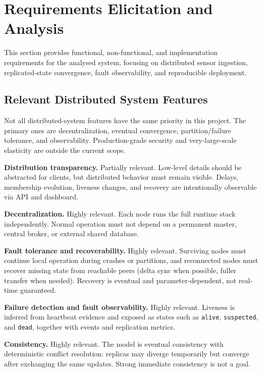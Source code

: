 \section{Requirements Elicitation and Analysis}\label{requirements}

This section provides functional, non-functional, and implementation requirements for the analysed system, focusing on distributed sensor ingestion, replicated-state convergence, fault observability, and reproducible deployment.

\subsection{Relevant Distributed System Features}
\label{ds-features}

Not all distributed-system features have the same priority in this project. The primary ones are decentralization, eventual convergence, partition/failure tolerance, and observability. Production-grade security and very-large-scale elasticity are outside the current scope.

\textbf{Distribution transparency.}
Partially relevant. Low-level details should be abstracted for clients, but distributed behavior must remain visible. Delays, membership evolution, liveness changes, and recovery are intentionally observable via API and dashboard.

\medskip
\textbf{Decentralization.}
Highly relevant. Each node runs the full runtime stack independently. Normal operation must not depend on a permanent master, central broker, or external shared database.

\medskip
\textbf{Fault tolerance and recoverability.}
Highly relevant. Surviving nodes must continue local operation during crashes or partitions, and reconnected nodes must recover missing state from reachable peers (delta sync when possible, fuller transfer when needed). Recovery is eventual and parameter-dependent, not real-time guaranteed.

\medskip
\textbf{Failure detection and fault observability.}
Highly relevant. Liveness is inferred from heartbeat evidence and exposed as states such as \texttt{alive}, \texttt{suspected}, and \texttt{dead}, together with events and replication metrics.

\medskip
\textbf{Consistency.}
Highly relevant. The model is eventual consistency with deterministic conflict resolution: replicas may diverge temporarily but converge after exchanging the same updates. Strong immediate consistency is not a goal.

